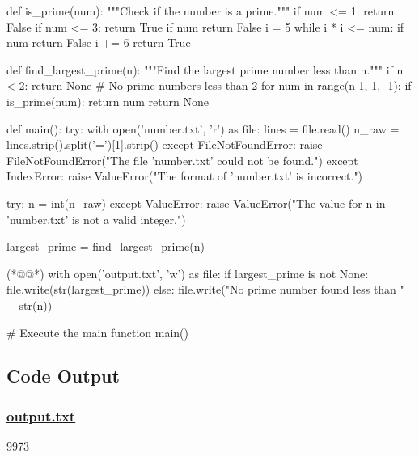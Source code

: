 \documentclass[11pt]{article}
\begin{document}
\begin{python}

def is_prime(num):
    """Check if the number is a prime."""
    if num <= 1:
        return False
    if num <= 3:
        return True
    if num %
        return False
    i = 5
    while i * i <= num:
        if num %
            return False
        i += 6
    return True

def find_largest_prime(n):
    """Find the largest prime number less than n."""
    if n < 2:
        return None  # No prime numbers less than 2
    for num in range(n-1, 1, -1):
        if is_prime(num):
            return num
    return None

def main():
    try:
        with open('number.txt', 'r') as file:
            lines = file.read()
        n_raw = lines.strip().split('=')[1].strip()
    except FileNotFoundError:
        raise FileNotFoundError("The file 'number.txt' could not be found.")
    except IndexError:
        raise ValueError("The format of 'number.txt' is incorrect.")

    try:
        n = int(n_raw)
    except ValueError:
        raise ValueError("The value for n in 'number.txt' is not a valid integer.")

    largest_prime = find_largest_prime(n)

(*@@*)    with open('output.txt', 'w') as file:
        if largest_prime is not None:
            file.write(str(largest_prime))
        else:
            file.write("No prime number found less than " + str(n))

# Execute the main function
main()

\end{python}



\subsection{Code Output}
\hypertarget{file-output-txt}{}

\subsubsection*{\hyperlink{code-output-txt}{output.txt}}

\begin{codeoutput}
9973
\end{codeoutput}
\end{document}
